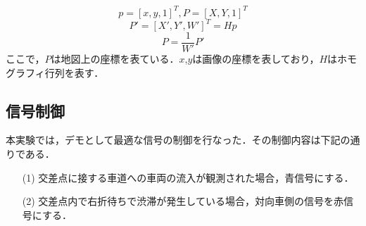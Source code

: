       \begin{equation}
  p = [x, y, 1]^T, P = [X, Y, 1]^T
\end{equation}
\begin{equation}
  P' = [X', Y', W']^T = Hp
\end{equation}
\begin{equation}
  P = \frac{1}{W'}P'
\end{equation}
ここで，$P$は地図上の座標を表ている．$x$,$y$は画像の座標を表しており，$H$はホモグラフィ行列を表す．

\subsection{信号制御}
本実験では，デモとして最適な信号の制御を行なった．その制御内容は下記の通りである．

\begin{itemize}
  \item[(1)]交差点に接する車道への車両の流入が観測された場合，青信号にする．
  \item[(2)]交差点内で右折待ちで渋滞が発生している場合，対向車側の信号を赤信号にする．
\end{itemize}



\newpage
